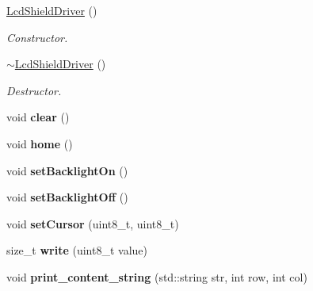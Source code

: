 \begin{DoxyCompactItemize}
\mbox{\label{classLcdShieldDriver_a14d2027ac041be273d6b894a6d66bb1f}} 
\hyperlink{classLcdShieldDriver_a14d2027ac041be273d6b894a6d66bb1f}{Lcd\+Shield\+Driver} ()
\begin{DoxyCompactList}\small\item\em Constructor. \end{DoxyCompactList}\item 
\mbox{\label{classLcdShieldDriver_aaec080d1c36326c1e58642a7e28d85b1}} 
\hyperlink{classLcdShieldDriver_aaec080d1c36326c1e58642a7e28d85b1}{$\sim$\+Lcd\+Shield\+Driver} ()
\begin{DoxyCompactList}\small\item\em Destructor. \end{DoxyCompactList}\item 
\mbox{\label{classLcdShieldDriver_a43e151fc827a4d8d982bc2857b78262e}} 
void {\bfseries clear} ()
\item 
\mbox{\label{classLcdShieldDriver_a7bccc296eef476eb49984bdf8fdebb14}} 
void {\bfseries home} ()
\item 
\mbox{\label{classLcdShieldDriver_a68a86a7407fd3df5714f3351d657e499}} 
void {\bfseries set\+Backlight\+On} ()
\item 
\mbox{\label{classLcdShieldDriver_a81639e7553501343137be8984d7ea7d9}} 
void {\bfseries set\+Backlight\+Off} ()
\item 
\mbox{\label{classLcdShieldDriver_a6733a16dc0e1d58cfdfb4019ea2e6582}} 
void {\bfseries set\+Cursor} (uint8\+\_\+t, uint8\+\_\+t)
\item 
\mbox{\label{classLcdShieldDriver_aea03f93f7dfad9bc185bd77ef059c665}} 
size\+\_\+t {\bfseries write} (uint8\+\_\+t value)
\item 
\mbox{\label{classLcdShieldDriver_a23bf393080e85a8433f6be74d131921a}} 
void {\bfseries print\+\_\+content\+\_\+string} (std\+::string str, int row, int col)
\item 
\mbox{\label{classLcdShieldDriver_aab9b70b973f0bd1d2076f5144da2f706}} 

\end{DoxyCompactItemize}
